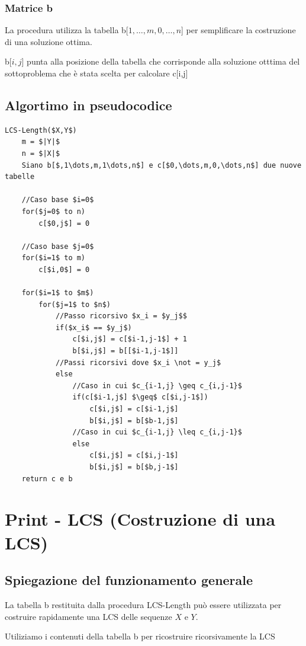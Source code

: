 \subsubsection{Matrice b}
La procedura utilizza la tabella b[$1,\dots,m,0,\dots,n$] per semplificare la costruzione di una soluzione ottima.

b[$i,j$] punta alla posizione della tabella che corrisponde alla soluzione otttima del sottoproblema che è stata scelta per calcolare c[i,j]

\subsection{Algortimo in pseudocodice}
\begin{lstlisting}[mathescape=true]
LCS-Length($X,Y$)
    m = $|Y|$
    n = $|X|$
    Siano b[$,1\dots,m,1\dots,n$] e c[$0,\dots,m,0,\dots,n$] due nuove tabelle

    //Caso base $i=0$
    for($j=0$ to n)
        c[$0,j$] = 0

    //Caso base $j=0$
    for($i=1$ to m)
        c[$i,0$] = 0
        
    for($i=1$ to $m$)
        for($j=1$ to $n$)
            //Passo ricorsivo $x_i = $y_j$$
            if($x_i$ == $y_j$)
                c[$i,j$] = c[$i-1,j-1$] + 1
                b[$i,j$] = b[[$i-1,j-1$]]
            //Passi ricorsivi dove $x_i \not = y_j$
            else 
                //Caso in cui $c_{i-1,j} \geq c_{i,j-1}$
                if(c[$i-1,j$] $\geq$ c[$i,j-1$])
                    c[$i,j$] = c[$i-1,j$]
                    b[$i,j$] = b[$b-1,j$] 
                //Caso in cui $c_{i-1,j} \leq c_{i,j-1}$
                else
                    c[$i,j$] = c[$i,j-1$]
                    b[$i,j$] = b[$b,j-1$]
    return c e b 
\end{lstlisting}

\newpage
\section{Print - LCS (Costruzione di una LCS)}
\subsection{Spiegazione del funzionamento generale}
La tabella b restituita dalla procedura LCS-Length può essere utilizzata per costruire rapidamente una LCS delle sequenze $X$ e $Y$.

Utiliziamo i contenuti della tabella b per ricostruire ricorsivamente la LCS

